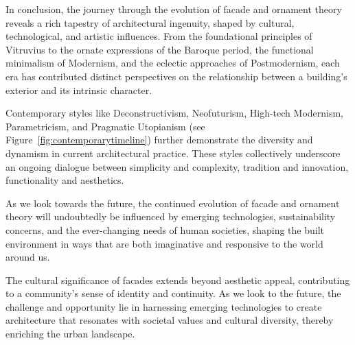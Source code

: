 In conclusion, the journey through the evolution of facade and ornament theory reveals a rich tapestry of architectural ingenuity, shaped by cultural, technological, and artistic influences.
From the foundational principles of Vitruvius to the ornate expressions of the Baroque period, the functional minimalism of Modernism, and the eclectic approaches of Postmodernism, each era has contributed distinct perspectives on the relationship between a building's exterior and its intrinsic character.

Contemporary styles like Deconstructivism, Neofuturism, High-tech Modernism, Parametricism, and Pragmatic Utopianism (see Figure~\ref{fig:contemporarytimeline}) further demonstrate the diversity and dynamism in current architectural practice.
These styles collectively underscore an ongoing dialogue between simplicity and complexity, tradition and innovation, functionality and aesthetics.

As we look towards the future, the continued evolution of facade and ornament theory will undoubtedly be influenced by emerging technologies, sustainability concerns, and the ever-changing needs of human societies, shaping the built environment in ways that are both imaginative and responsive to the world around us.

The cultural significance of facades extends beyond aesthetic appeal, contributing to a community's sense of identity and continuity.
As we look to the future, the challenge and opportunity lie in harnessing emerging technologies to create architecture that resonates with societal values and cultural diversity, thereby enriching the urban landscape.




